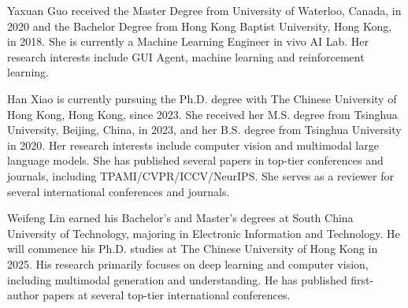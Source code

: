 \vspace{-3em}

\begin{IEEEbiography}{Yaxuan Guo}
received the Master Degree from University of Waterloo, Canada, in 2020 and the Bachelor Degree from Hong Kong Baptist University, Hong Kong, in 2018. She is currently a Machine Learning Engineer in vivo AI Lab. Her research interests include GUI Agent, machine learning and reinforcement learning.
\end{IEEEbiography}

\vspace{-3em}

\begin{IEEEbiography}{Han Xiao}
is currently pursuing the Ph.D. degree with The Chinese University of Hong Kong, Hong Kong, since 2023. She received her M.S. degree from Tsinghua University, Beijing, China, in 2023, and her B.S. degree from Tsinghua University in 2020. Her research interests include computer vision and multimodal large language models. She has published several papers in top-tier conferences and journals, including TPAMI/CVPR/ICCV/NeurIPS. She serves as a reviewer for several international conferences and journals.
\end{IEEEbiography}

\vspace{-3em}

\begin{IEEEbiography}{Weifeng Lin}
earned his Bachelor's and Master's degrees at South China University of Technology, majoring in Electronic Information and Technology. He will commence his Ph.D. studies at The Chinese University of Hong Kong in 2025. His research primarily focuses on deep learning and computer vision, including multimodal generation and understanding. He has published first-author papers at several top-tier international conferences.
\end{IEEEbiography}

